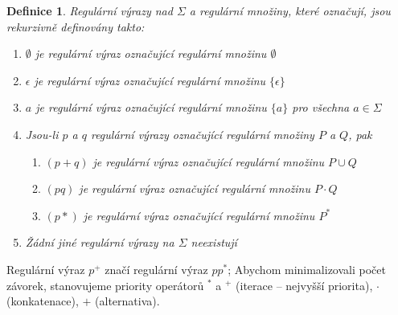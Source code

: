 \documentclass[a4paper, 11pt]{report}
\newtheorem{mydef}{Definice}[chapter]
\begin{document}
\begin{mydef}
Regulární výrazy nad $\Sigma$ a regulární množiny, které označují, jsou rekurzivně definovány takto:
\begin{enumerate}
	\item $\emptyset$ je regulární výraz označující regulární množinu $\emptyset$
	\item $\epsilon$ je regulární výraz označující regulární množinu $\{ \epsilon \}$
	\item $a$ je regulární výraz označující regulární množinu $\{ a \}$ pro všechna $a \in \Sigma$
	\item Jsou-li $p$ a $q$ regulární výrazy označující regulární množiny $P$ a $Q$, pak
	\begin{enumerate}
		\item $(p+q)$ je regulární výraz označující regulární množinu $P \cup Q$
		\item $(pq)$ je regulární výraz označující regulární množinu $P \cdot Q$
		\item $(p*)$ je regulární výraz označující regulární množinu $P^*$
	\end{enumerate}
	\item Žádní jiné regulární výrazy na $\Sigma$ neexistují
\end{enumerate}
\end{mydef}

Regulární výraz $p^+$ značí regulární výraz $pp^*$; Abychom minimalizovali počet závorek, stanovujeme priority operátorů $^*$ a $^+$ (iterace -- nejvyšší priorita), $\cdot$ (konkatenace), $+$ (alternativa).
\end{document}
